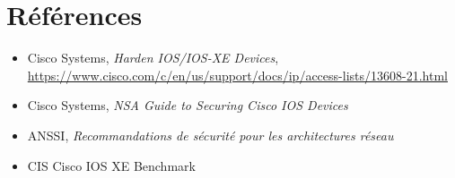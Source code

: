 \documentclass[12pt, a4paper]{report}
\begin{document}
\section{Références}

\begin{itemize}[leftmargin=1.5cm]
  \item Cisco Systems, \textit{Harden IOS/IOS-XE Devices}, \url{https://www.cisco.com/c/en/us/support/docs/ip/access-lists/13608-21.html}
  \item Cisco Systems, \textit{NSA Guide to Securing Cisco IOS Devices}
  \item ANSSI, \textit{Recommandations de sécurité pour les architectures réseau}
  \item CIS Cisco IOS XE Benchmark
\end{itemize}
\end{document}
